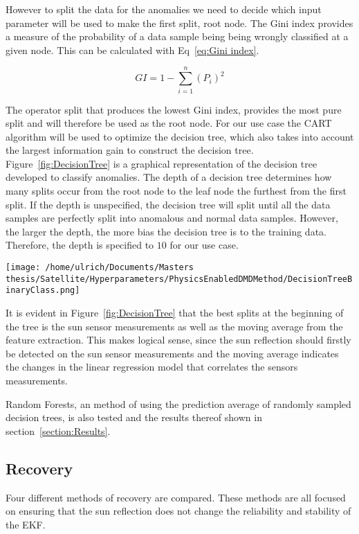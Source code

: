 \documentclass[letterpaper, 10 pt, conference]{ieeeconf}  %
\begin{document}
However to split the data for the anomalies we need to decide which input parameter will be used to make the first split, root node. The Gini index provides a measure of the probability of a data sample being being wrongly classified at a given node. This can be calculated with Eq~\ref{eq:Gini index}.

\begin{equation}
GI = 1 - \sum_{i = 1}^{n}{(P_i)^2}
\label{eq:Gini index}
\end{equation}

The operator split that produces the lowest Gini index, provides the most pure split and will therefore be used as the root node. For our use case the CART algorithm will be used to optimize the decision tree, which also takes into account the largest information gain to construct the decision tree. Figure~\ref{fig:DecisionTree} is a graphical representation of the decision tree developed to classify anomalies. The depth of a decision tree determines how many splits occur from the root node to the leaf node the furthest from the first split. If the depth is unspecified, the decision tree will split until all the data samples are perfectly split into anomalous and normal data samples. However, the larger the depth, the more bias the decision tree is to the training data. Therefore, the depth is specified to $10$ for our use case.

\begin{figure*}[!htb]
	\centering
	\texttt{[image: /home/ulrich/Documents/Masters thesis/Satellite/Hyperparameters/PhysicsEnabledDMDMethod/DecisionTreeBinaryClass.png]}
	\label{fig:DecisionTree}
	\caption{Decision Tree}
\end{figure*}

It is evident in Figure~\ref{fig:DecisionTree} that the best splits at the beginning of the tree is the sun sensor measurements as well as the moving average from the feature extraction. This makes logical sense, since the sun reflection should firstly be detected on the sun sensor measurements and the moving average indicates the changes in the linear regression model that correlates the sensors measurements.

Random Forests, an method of using the prediction average of randomly sampled decision trees, is also tested and the results thereof shown in section~\ref{section:Results}.  


\subsection{Recovery}
Four different methods of recovery are compared. These methods are all focused on ensuring that the sun reflection does not change the reliability and stability of the EKF.
\end{document}
